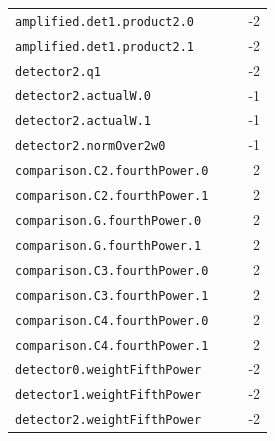 \begin{longtable}{p{0.80\linewidth}r}
\texttt{amplified.det1.product2.0} & -2\\
\texttt{amplified.det1.product2.1} & -2\\
\texttt{detector2.q1} & -2\\
\texttt{detector2.actualW.0} & -1\\
\texttt{detector2.actualW.1} & -1\\
\texttt{detector2.normOver2w0} & -1\\
\texttt{comparison.C2.fourthPower.0} & 2\\
\texttt{comparison.C2.fourthPower.1} & 2\\
\texttt{comparison.G.fourthPower.0} & 2\\
\texttt{comparison.G.fourthPower.1} & 2\\
\texttt{comparison.C3.fourthPower.0} & 2\\
\texttt{comparison.C3.fourthPower.1} & 2\\
\texttt{comparison.C4.fourthPower.0} & 2\\
\texttt{comparison.C4.fourthPower.1} & 2\\
\texttt{detector0.weightFifthPower} & -2\\
\texttt{detector1.weightFifthPower} & -2\\
\texttt{detector2.weightFifthPower} & -2\\
\bottomrule\end{longtable}
\normalsize

